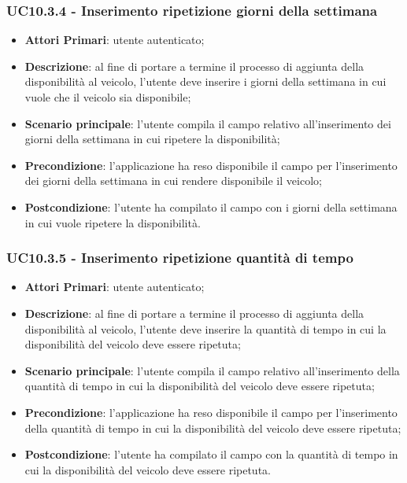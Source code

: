 \subsubsection{UC10.3.4 - Inserimento ripetizione giorni della settimana}
\begin{itemize}
	\item \textbf{Attori Primari}: utente autenticato;
	\item \textbf{Descrizione}: al fine di portare a termine il processo di aggiunta della disponibilità al veicolo, l'utente deve inserire i giorni della settimana in cui vuole che il veicolo sia disponibile;
	\item \textbf{Scenario principale}: l'utente compila il campo relativo all'inserimento dei giorni della settimana in cui ripetere la disponibilità;	
	\item \textbf{Precondizione}: l'applicazione ha reso disponibile il campo per l'inserimento dei giorni della settimana in cui rendere disponibile il veicolo;
	\item \textbf{Postcondizione}: l'utente ha compilato il campo con i giorni della settimana in cui vuole ripetere la disponibilità.	
\end{itemize}
\subsubsection{UC10.3.5 - Inserimento ripetizione quantità di tempo}
\begin{itemize}
	\item \textbf{Attori Primari}: utente autenticato;
	\item \textbf{Descrizione}: al fine di portare a termine il processo di aggiunta della disponibilità al veicolo, l'utente deve inserire la quantità di tempo in cui la disponibilità del veicolo deve essere ripetuta;
	\item \textbf{Scenario principale}: l'utente compila il campo relativo all'inserimento della quantità di tempo in cui la disponibilità del veicolo deve essere ripetuta;	
	\item \textbf{Precondizione}: l'applicazione ha reso disponibile il campo per l'inserimento della quantità di tempo in cui la disponibilità del veicolo deve essere ripetuta;
	\item \textbf{Postcondizione}: l'utente ha compilato il campo con la quantità di tempo in cui la disponibilità del veicolo deve essere ripetuta.	
\end{itemize}
